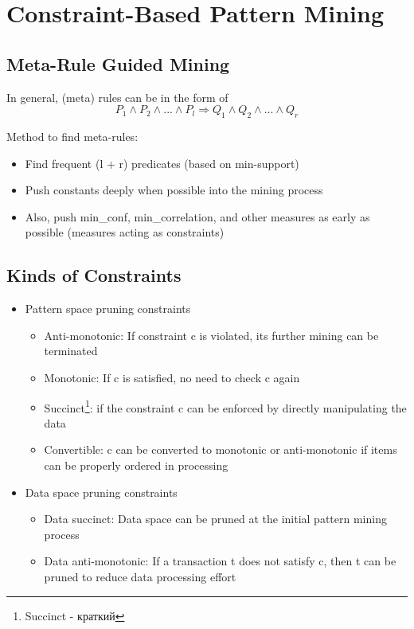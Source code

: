 \section{Constraint-Based Pattern Mining}
\subsection{Meta-Rule Guided Mining}
In general, (meta) rules can be in the form of
\begin{equation*}
P_1 \wedge P_2 \wedge ... \wedge P_l \Rightarrow Q_1 \wedge Q_2 \wedge ... \wedge Q_r
\end{equation*}

Method to find meta-rules:
\begin{itemize}
\item Find frequent (l + r) predicates (based on min-support)
\item Push constants deeply when possible into the mining process
\item Also, push min\_conf, min\_correlation, and other measures as early as possible (measures acting as constraints)
\end{itemize}

\subsection{Kinds of Constraints}
\begin{itemize}
\item Pattern space pruning constraints
\begin{itemize}
\item Anti-monotonic: If constraint c is violated, its further mining can be terminated
\item Monotonic: If c is satisfied, no need to check c again
\item Succinct\footnote{Succinct - краткий}: if the constraint c can be enforced by directly manipulating the data
\item Convertible: c can be converted to monotonic or anti-monotonic if items can be properly ordered in processing
\end{itemize}
\item Data space pruning constraints
\begin{itemize}
\item Data succinct: Data space can be pruned at the initial pattern mining process
\item Data anti-monotonic: If a transaction t does not satisfy c, then t can be pruned to reduce data processing effort
\end{itemize}
\end{itemize}

